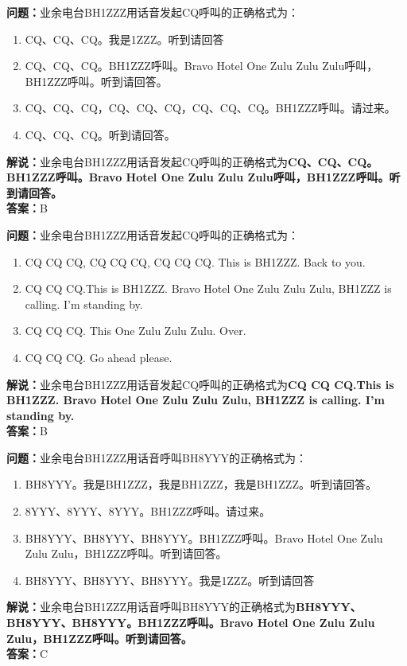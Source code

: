 \documentclass{ctexbook}
\begin{document}
\bigskip


\noindent\textbf{问题：}业余电台BH1ZZZ用话音发起CQ呼叫的正确格式为：
\begin{enumerate}[label=\Alph*), leftmargin=3em]
	\item CQ、CQ、CQ。我是1ZZZ。听到请回答
	\item CQ、CQ、CQ。BH1ZZZ呼叫。Bravo Hotel One Zulu Zulu Zulu呼叫，BH1ZZZ呼叫。听到请回答。
	\item CQ、CQ、CQ，CQ、CQ、CQ，CQ、CQ、CQ。BH1ZZZ呼叫。请过来。
	\item CQ、CQ、CQ。听到请回答。
\end{enumerate}
\noindent\textbf{解说：}业余电台BH1ZZZ用话音发起CQ呼叫的正确格式为\textbf{CQ、CQ、CQ。BH1ZZZ呼叫。Bravo Hotel One Zulu Zulu Zulu呼叫，BH1ZZZ呼叫。听到请回答。}\\\noindent\textbf{答案：}B

\bigskip


\noindent\textbf{问题：}业余电台BH1ZZZ用话音发起CQ呼叫的正确格式为：
\begin{enumerate}[label=\Alph*), leftmargin=3em]
	\item CQ CQ CQ, CQ CQ CQ, CQ CQ CQ. This is BH1ZZZ. Back to you.
	\item CQ CQ CQ.This is BH1ZZZ. Bravo Hotel One Zulu Zulu Zulu, BH1ZZZ is calling. I’m standing by.
	\item CQ CQ CQ. This One Zulu Zulu Zulu. Over.
	\item CQ CQ CQ. Go ahead please.
\end{enumerate}
\noindent\textbf{解说：}业余电台BH1ZZZ用话音发起CQ呼叫的正确格式为\textbf{CQ CQ CQ.This is BH1ZZZ. Bravo Hotel One Zulu Zulu Zulu, BH1ZZZ is calling. I’m standing by.}\\\noindent\textbf{答案：}B


\bigskip


\noindent\textbf{问题：}业余电台BH1ZZZ用话音呼叫BH8YYY的正确格式为：
\begin{enumerate}[label=\Alph*), leftmargin=3em]
	\item BH8YYY。我是BH1ZZZ，我是BH1ZZZ，我是BH1ZZZ。听到请回答。
	\item 8YYY、8YYY、8YYY。BH1ZZZ呼叫。请过来。
	\item BH8YYY、BH8YYY、BH8YYY。BH1ZZZ呼叫。Bravo Hotel One Zulu Zulu Zulu，BH1ZZZ呼叫。听到请回答。
	\item BH8YYY、BH8YYY、BH8YYY。我是1ZZZ。听到请回答
\end{enumerate}
\noindent\textbf{解说：}业余电台BH1ZZZ用话音呼叫BH8YYY的正确格式为\textbf{BH8YYY、BH8YYY、BH8YYY。BH1ZZZ呼叫。Bravo Hotel One Zulu Zulu Zulu，BH1ZZZ呼叫。听到请回答。}\\\noindent\textbf{答案：}C
\end{document}
